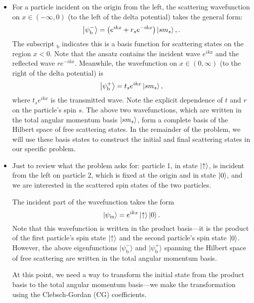 \documentclass[11pt, a4paper]{article}
\newcommand{\ua}{\uparrow}  %
\newcommand{\bket}[1]{\big | {#1} \big \rangle}  %
\begin{document}
\begin{itemize}
	\item  For a particle incident on the origin from the left, the scattering wavefunction on $ x \in (-\infty, 0) $ (to the left of the delta potential) takes the general form:
	\begin{equation*}
		\bket{\psi_{\text{b}}^{-}} = \left(e^{ik x} + r_{s}e^{-ik x}\right)\ket{sm_{s}},.
	\end{equation*}
	The subscript $ {}_{\text{b}} $ indicates this is a basis function for scattering states on the region $ x < 0 $. Note that the ansatz contains the incident wave $ e^{ikx} $ and the reflected wave $ re^{-ikx} $.  Meanwhile, the wavefunction on $ x \in (0, \infty)  $ (to the right of the delta potential) is
	\begin{equation*}
		\ket{\psi_{\text{b}}^{+}} = t_{s} e^{ikx}\ket{sm_{s}},
	\end{equation*}
	where $ t_{s}e^{ikx} $ is the transmitted wave. Note the explicit dependence of $ t $ and $ r $ on the particle's spin $ s $. The above two wavefunctions, which are written in the total angular momentum basis $ \ket{sm_{s}} $, form a complete basis of the Hilbert space of free scattering states. In the remainder of the problem, we will use these basis states to construct the initial and final scattering states in our specific problem. 
	

			
	\item Just to review what the problem asks for: particle 1, in state $ \ket{\ua} $, is incident from the left on particle 2, which is fixed at the origin and in state $ \ket{0} $, and we are interested in the scattered spin states of the two particles.
	
	The incident part of the wavefunction takes the form
	\begin{equation*}
		\ket{\psi_{\text{in}}} = e^{ikx} \ket{\ua} \ket{0}.
	\end{equation*}
	Note that this wavefunction is written in the product basis---it is the product of the first particle's spin state $ \ket{\ua} $ and the second particle's spin state $ \ket{0} $. However, the above eigenfunctions $ \bket{\psi_{\text{b}}^{-}} $ and $ \bket{\psi_{\text{b}}^{+}} $ spanning the Hilbert space of free scattering are written in the total angular momentum basis.
	
	At this point, we need a way to transform the initial state from the product basis to the total angular momentum basis---we make the transformation using the Clebsch-Gordan (CG) coefficients.
\end{itemize}	
\end{document}
